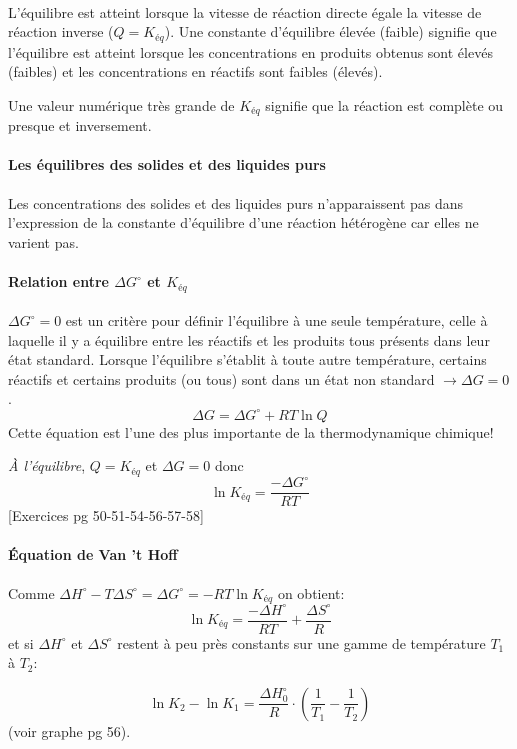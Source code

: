 \documentclass[11pt,a4paper,french]{article}
\begin{document}
\paragraph{}
L'équilibre est atteint lorsque la vitesse de réaction directe égale la vitesse de réaction inverse ($Q=K_{éq}$).
Une constante d'équilibre élevée (faible) signifie que l'équilibre est atteint lorsque les concentrations en produits obtenus sont élevés (faibles) et les concentrations en réactifs sont faibles (élevés).

Une valeur numérique très grande de $K_{éq}$ signifie que la réaction est complète ou presque et inversement.

\paragraph{Les équilibres des solides et des liquides purs} Les concentrations des solides et des liquides purs n'apparaissent pas dans l'expression de la constante d'équilibre d'une réaction hétérogène car elles ne varient pas.

\paragraph{Relation entre $\Delta G^{\circ}$ et $K_{éq}$}
$\Delta G^{\circ}=0$ est un critère pour définir l'équilibre à une seule température, celle à laquelle il y a équilibre entre les réactifs et les produits tous présents dans leur état standard.
Lorsque l'équilibre s'établit à toute autre température, certains réactifs et certains produits (ou tous) sont dans un état non standard $\rightarrow \Delta G =0$.
$$\Delta G=\Delta G^{\circ}+RT\ln Q$$
Cette équation est l'une des plus importante de la thermodynamique chimique!

\emph{À l'équilibre}, $Q=K_{éq}$ et $\Delta G=0$ donc $$\ln K_{éq}=\frac{-\Delta G^{\circ}}{RT}$$
[Exercices pg 50-51-54-56-57-58]

\paragraph{\'Equation de Van 't Hoff}
Comme $\Delta H^{\circ}-T\Delta S^{\circ}=\Delta G^{\circ}=-RT\ln K_{éq}$ on obtient:
$$\ln K_{éq}=\frac{-\Delta H^{\circ}}{RT}+\frac{\Delta S^{\circ}}{R}$$
et si $\Delta H^{\circ}$ et $\Delta S^{\circ}$ restent à peu près constants sur une gamme de température $T_1$ à $T_2$:

$$\ln{K_2}-\ln{K_1}=\frac{\Delta H^{\circ}_0}{R}\cdot\left(\frac{1}{T_1}-\frac{1}{T_2}\right)$$
(voir graphe pg 56).
\end{document}
